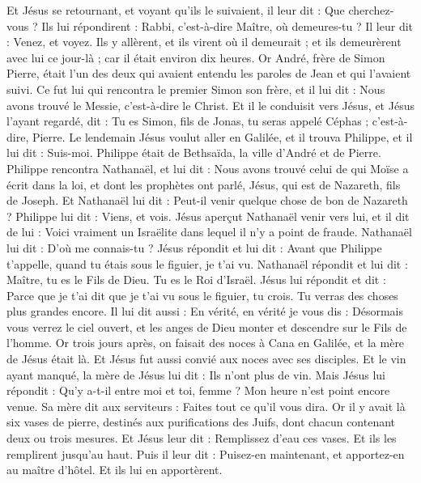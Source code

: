 \begin{multicols}{2}
Et Jésus se retournant, et voyant qu'ils le suivaient, il leur dit : Que cherchez-vous ? Ils lui répondirent : Rabbi, c'est-à-dire Maître, où demeures-tu ?
Il leur dit : Venez, et voyez. Ils y allèrent, et ils virent où il demeurait ; et ils demeurèrent avec lui ce jour-là ; car il était environ dix heures.
Or André, frère de Simon Pierre, était l'un des deux qui avaient entendu les paroles de Jean et qui l'avaient suivi.
Ce fut lui qui rencontra le premier Simon son frère, et il lui dit : Nous avons trouvé le Messie, c'est-à-dire le Christ.
Et il le conduisit vers Jésus, et Jésus l'ayant regardé, dit : Tu es Simon, fils de Jonas, tu seras appelé Céphas ; c'est-à-dire, Pierre.
Le lendemain Jésus voulut aller en Galilée, et il trouva Philippe, et il lui dit : Suis-moi.
Philippe était de Bethsaïda, la ville d'André et de Pierre.
Philippe rencontra Nathanaël, et lui dit : Nous avons trouvé celui de qui Moïse a écrit dans la loi, et dont les prophètes ont parlé, Jésus, qui est de Nazareth, fils de Joseph.
Et Nathanaël lui dit : Peut-il venir quelque chose de bon de Nazareth ? Philippe lui dit : Viens, et vois.
Jésus aperçut Nathanaël venir vers lui, et il dit de lui : Voici vraiment un Israëlite dans lequel il n'y a point de fraude.
Nathanaël lui dit : D'où me connais-tu ? Jésus répondit et lui dit : Avant que Philippe t'appelle, quand tu étais sous le figuier, je t'ai vu.
Nathanaël répondit et lui dit : Maître, tu es le Fils de Dieu. Tu es le Roi d'Israël.
Jésus lui répondit et dit : Parce que je t'ai dit que je t'ai vu sous le figuier, tu crois. Tu verras des choses plus grandes encore.
Il lui dit aussi : En vérité, en vérité je vous dis : Désormais vous verrez le ciel ouvert, et les anges de Dieu monter et descendre sur le Fils de l'homme.
\VerseOne{}Or trois jours après, on faisait des noces à Cana en Galilée, et la mère de Jésus était là.
Et Jésus fut aussi convié aux noces avec ses disciples.
Et le vin ayant manqué, la mère de Jésus lui dit : Ils n'ont plus de vin.
Mais Jésus lui répondit : Qu'y a-t-il entre moi et toi, femme ? Mon heure n'est point encore venue.
Sa mère dit aux serviteurs : Faites tout ce qu'il vous dira.
Or il y avait là six vases de pierre, destinés aux purifications des Juifs, dont chacun contenant deux ou trois mesures.
Et Jésus leur dit : Remplissez d'eau ces vases. Et ils les remplirent jusqu'au haut.
Puis il leur dit : Puisez-en maintenant, et apportez-en au maître d'hôtel. Et ils lui en apportèrent.

\end{multicols}
